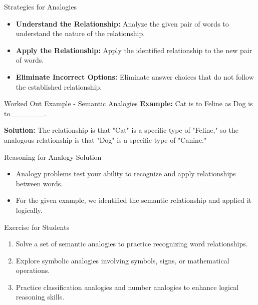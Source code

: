 \begin{frame}{Strategies for Analogies}
  \begin{itemize}
    \item \textbf{Understand the Relationship:} Analyze the given pair of words to understand the nature of the relationship.
    \item \textbf{Apply the Relationship:} Apply the identified relationship to the new pair of words.
    \item \textbf{Eliminate Incorrect Options:} Eliminate answer choices that do not follow the established relationship.
  \end{itemize}
\end{frame}

\begin{frame}{Worked Out Example - Semantic Analogies}
  \textbf{Example:} Cat is to Feline as Dog is to \_\_\_\_\_\_.

  \textbf{Solution:} The relationship is that "Cat" is a specific type of "Feline," so the analogous relationship is that "Dog" is a specific type of "Canine."
\end{frame}

\begin{frame}{Reasoning for Analogy Solution}
  \begin{itemize}
    \item Analogy problems test your ability to recognize and apply relationships between words.
    \item For the given example, we identified the semantic relationship and applied it logically.
  \end{itemize}
\end{frame}

\begin{frame}{Exercise for Students}
  \begin{enumerate}
    \item Solve a set of semantic analogies to practice recognizing word relationships.
    \item Explore symbolic analogies involving symbols, signs, or mathematical operations.
    \item Practice classification analogies and number analogies to enhance logical reasoning skills.
  \end{enumerate}
\end{frame}
